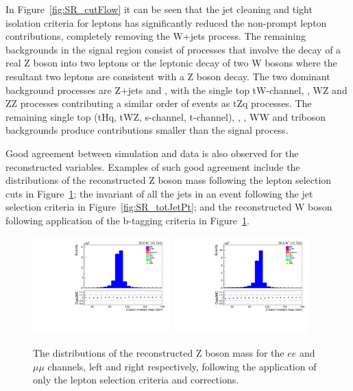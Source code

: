 In Figure~\ref{fig:SR_cutFlow} it can be seen that the jet cleaning and tight isolation criteria for leptons has significantly reduced the non-prompt lepton contributions, completely removing the W+jets process.
The remaining backgrounds in the signal region consist of processes that involve the decay of a  real Z boson into two leptons or the leptonic decay of two W bosons where the resultant two leptons are consistent with a Z boson decay.
The two dominant background processes are Z+jets and \ttbar, with the single top tW-channel, \ttbarZ, WZ and ZZ processes contributing a similar order of events as tZq processes.
The remaining single top (tHq, tWZ, s-channel, t-channel), \ttbarW, \ttbarH, WW and triboson backgrounds produce contributions smaller than the signal process.

Good agreement between simulation and data is also observed for the reconstructed variables.
Examples of such good agreement include the distributions of the reconstructed Z boson mass following the lepton selection cuts in Figure~\ref{fig:SR_zBoson}; the invariant \pT of all the jets in an event following the jet selection criteria in Figure~\ref{fig:SR_totJetPt}; and the reconstructed W boson following application of the b-tagging criteria in Figure~\ref{fig:SR_zBoson}.

\begin{figure}[htbp]
\centering
\includegraphics[width=0.47\textwidth]{figs/background-estimation/plots/unblinded/prompt_ee_ttbarInc/zPairMass_NPL_ee_lepSel_ee.pdf}
\includegraphics[width=0.47\textwidth]{figs/background-estimation/plots/unblinded/prompt_mumu_ttbarInc/zPairMass_NPL_mumu_lepSel_mumu.pdf}
\caption{
The distributions of the reconstructed Z boson mass for the $ee$ and $\mu\mu$ channels, left and right respectively, following the application of only the lepton selection criteria and corrections.
}
\label{fig:SR_zBoson}
\end{figure}

